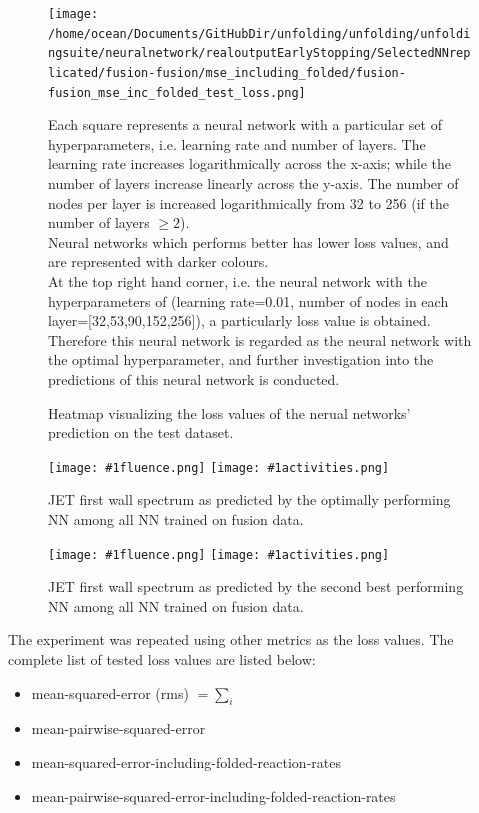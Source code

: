 \documentclass[a4paper, 12pt]{article}
\newcommand{\fluenceandactivities}[1]{
\texttt{[image: \#1fluence.png]}
\texttt{[image: \#1activities.png]}
}
\begin{document}
\begin{figure}
\centering
\texttt{[image: /home/ocean/Documents/GitHubDir/unfolding/unfolding/unfoldingsuite/neuralnetwork/realoutputEarlyStopping/SelectedNNreplicated/fusion-fusion/mse\_including\_folded/fusion-fusion\_mse\_inc\_folded\_test\_loss.png]}
\caption{Heatmap visualizing the loss values of the nerual networks' prediction on the test dataset.}\label{hyperparametersearchTestLoss}
Each square represents a neural network with a particular set of hyperparameters, i.e. learning rate and number of layers. The learning rate increases logarithmically across the x-axis; while the number of layers increase linearly across the y-axis. The number of nodes per layer is increased logarithmically from 32 to 256 (if the number of layers $\ge 2$).\\
Neural networks which performs better has lower loss values, and are represented with darker colours.\\
At the top right hand corner, i.e. the neural network with the hyperparameters of (learning rate=0.01, number of nodes in each layer=[32,53,90,152,256]), a particularly loss value is obtained. Therefore this neural network is regarded as the neural network with the optimal hyperparameter, and further investigation into the predictions of this neural network is conducted.
\end{figure}

\begin{figure}
\centering
\fluenceandactivities{/home/ocean/Documents/GitHubDir/unfolding/unfolding/unfoldingsuite/neuralnetwork/realoutputEarlyStopping/SelectedNNreplicated/fusion-fusion/0918_0332_5_layer_top_right_anomaly_test_001_}
\caption{JET first wall spectrum as predicted by the optimally performing NN among all NN trained on fusion data.}\label{5Layerfusion-fusionJET-FW}
\end{figure}

\begin{figure}
\centering
\fluenceandactivities{/home/ocean/Documents/GitHubDir/unfolding/unfolding/unfoldingsuite/neuralnetwork/realoutputEarlyStopping/SelectedNNreplicated/fusion-fusion/0918_0332_3_layer_typical_mpse_test_001_}
\caption{JET first wall spectrum as predicted by the second best performing NN among all NN trained on fusion data.}\label{3Layerfusion-fusionJET-FW}
\end{figure}

The experiment was repeated using other metrics as the loss values. The complete list of tested loss values are listed below:
\begin{itemize}
    \item mean-squared-error (rms) $=\sum_i$
    \item mean-pairwise-squared-error
    \item mean-squared-error-including-folded-reaction-rates
    \item mean-pairwise-squared-error-including-folded-reaction-rates
\end{itemize}
\end{document}
